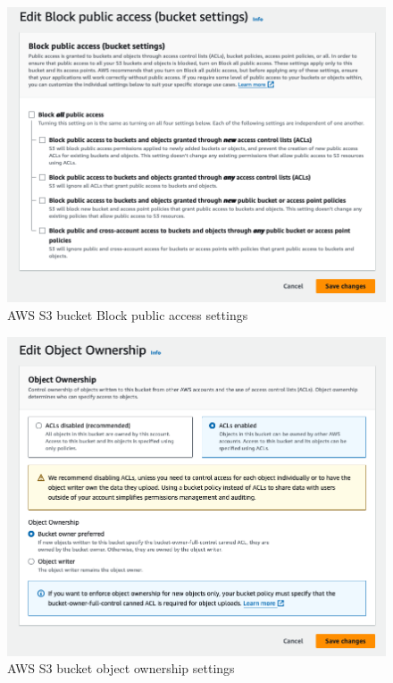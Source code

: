 \begin{figure}[H]\centering
\includegraphics[width=140mm]{img/docs/fig_aws_s3_bucket_public.png}
\caption{AWS S3 bucket Block public access settings}
\label{img:admin-manual-aws.s3.public}
\end{figure}

\begin{figure}[H]\centering
\includegraphics[width=140mm]{img/docs/fig_aws_object_ownership.png}
\caption{AWS S3 bucket object ownership settings}
\label{img:admin-manual-aws.s3.acls}
\end{figure}


